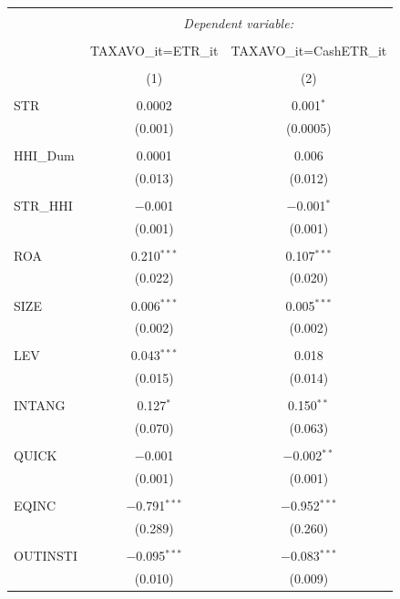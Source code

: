 \documentclass[a4paper,14pt]{article}\usepackage[]{graphicx}\usepackage[]{color}
\begin{document}
\begin{table}[!htbp] \centering 
  \caption{} 
  \label{} 
\begin{tabular}{@{\extracolsep{5pt}}lcc} 
\\[-1.8ex]\hline 
\hline \\[-1.8ex] 
 & \multicolumn{2}{c}{\textit{Dependent variable:}} \\ 
\cline{2-3} 
\\[-1.8ex] & TAXAVO_{it}=ETR_{it} & TAXAVO_{it}=CashETR_{it} \\ 
\\[-1.8ex] & (1) & (2)\\ 
\hline \\[-1.8ex] 
 STR & 0.0002 & 0.001$^{*}$ \\ 
  & (0.001) & (0.0005) \\ 
  & & \\ 
 HHI\_Dum & 0.0001 & 0.006 \\ 
  & (0.013) & (0.012) \\ 
  & & \\ 
 STR\_HHI & $-$0.001 & $-$0.001$^{*}$ \\ 
  & (0.001) & (0.001) \\ 
  & & \\ 
 ROA & 0.210$^{***}$ & 0.107$^{***}$ \\ 
  & (0.022) & (0.020) \\ 
  & & \\ 
 SIZE & 0.006$^{***}$ & 0.005$^{***}$ \\ 
  & (0.002) & (0.002) \\ 
  & & \\ 
 LEV & 0.043$^{***}$ & 0.018 \\ 
  & (0.015) & (0.014) \\ 
  & & \\ 
 INTANG & 0.127$^{*}$ & 0.150$^{**}$ \\ 
  & (0.070) & (0.063) \\ 
  & & \\ 
 QUICK & $-$0.001 & $-$0.002$^{**}$ \\ 
  & (0.001) & (0.001) \\ 
  & & \\ 
 EQINC & $-$0.791$^{***}$ & $-$0.952$^{***}$ \\ 
  & (0.289) & (0.260) \\ 
  & & \\ 
 OUTINSTI & $-$0.095$^{***}$ & $-$0.083$^{***}$ \\ 
  & (0.010) & (0.009) \\ 

\end{tabular}
\end{table}
\end{document}
